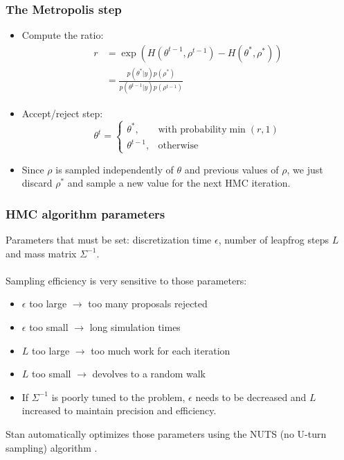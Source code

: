 \documentclass{beamer}
\begin{document}
\begin{frame}
  \frametitle{The Metropolis step}
  
  \begin{itemize}
  \item Compute the ratio:
    \begin{align*}
      r &= \exp\left(H\left(\theta^{t-1}, \rho^{t-1}\right) -
          H\left(\theta^*, \rho^*\right)\right) \\
        &= \frac{p\left(\theta^* | y\right) p\left(\rho^*\right)}{p\left(\theta^{t-1} | y\right) p\left(\rho^{t-1}\right)}
    \end{align*}
  \item Accept/reject step:
     $$ \theta^t = \left\{\begin{array}{ll}
                            \theta^*, & \text{with probability} \min\left(r, 1\right) \\
                            \theta^{t-1}, & \text{otherwise}
                          \end{array} \right. $$
\item Since $\rho$ is sampled independently of
                        $\theta$ and previous values of $\rho$, we
                        just discard $\rho^*$ and sample a new value
                        for the next HMC iteration.
\end{itemize}

\end{frame}

\begin{frame}
  \frametitle{HMC algorithm parameters}
  
Parameters that must be set: discretization time $\epsilon$, number of
leapfrog steps $L$ and mass matrix $\Sigma^{-1}$.\\ \ \\
Sampling efficiency is very sensitive to those parameters:
\begin{itemize}
\item $\epsilon$ too large $\rightarrow$ too many proposals rejected
\item $\epsilon$ too small $\rightarrow$ long simulation times
\item $L$ too large $\rightarrow$ too much work for each iteration
\item $L$ too small $\rightarrow$ devolves to a random walk
\item If $\Sigma^{-1}$ is poorly tuned to the problem, $\epsilon$
  needs to be decreased and $L$ increased to maintain precision and efficiency. 
\end{itemize}
Stan automatically optimizes those parameters using the NUTS (no
U-turn sampling) algorithm \cite{hoffman2014}. 

\end{frame}
\end{document}
